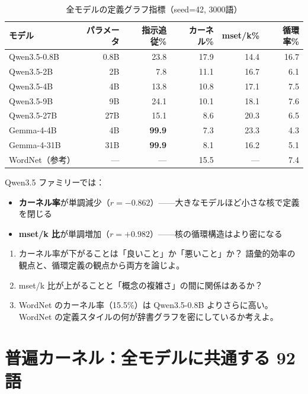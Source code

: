 \documentclass[lang=jp, color=black, mode=simple, 11pt]{elegantbook}
\begin{document}
\begin{table}[htbp]
\centering
\caption{全モデルの定義グラフ指標（seed=42, 3000語）}
\begin{tabular}{lrrrrr}
\toprule
モデル & パラメータ & 指示追従\% & カーネル\% & mset/k\% & 循環率\% \\
\midrule
Qwen3.5-0.8B & 0.8B & 23.8 & 17.9 & 14.4 & 16.7 \\
Qwen3.5-2B   & 2B   &  7.8 & 11.1 & 16.7 &  6.1 \\
Qwen3.5-4B   & 4B   & 13.8 & 10.8 & 17.1 &  7.5 \\
Qwen3.5-9B   & 9B   & 24.1 & 10.1 & 18.1 &  7.6 \\
Qwen3.5-27B  & 27B  & 15.1 &  8.6 & 20.3 &  6.5 \\
\midrule
Gemma-4-4B   & 4B   & \textbf{99.9} & 7.3 & 23.3 & 4.3 \\
Gemma-4-31B  & 31B  & \textbf{99.9} & 8.1 & 16.2 & 5.1 \\
\midrule
WordNet（参考） & --- & --- & 15.5 & --- & 7.4 \\
\bottomrule
\end{tabular}
\end{table}

Qwen3.5 ファミリーでは：
\begin{itemize}
  \item \textbf{カーネル率}が単調減少（$r = -0.862$）——大きなモデルほど小さな核で定義を閉じる
  \item \textbf{mset/k 比}が単調増加（$r = +0.982$）——核の循環構造はより密になる
\end{itemize}

\begin{reflect}
\begin{enumerate}
  \item カーネル率が下がることは「良いこと」か「悪いこと」か？
        語彙的効率の観点と、循環定義の観点から両方を論じよ。
  \item mset/k 比が上がることと「概念の複雑さ」の間に関係はあるか？
  \item WordNet のカーネル率（15.5\%）は Qwen3.5-0.8B よりさらに高い。
        WordNet の定義スタイルの何が辞書グラフを密にしているか考えよ。
\end{enumerate}
\end{reflect}

\section{普遍カーネル：全モデルに共通する 92 語}
\end{document}
